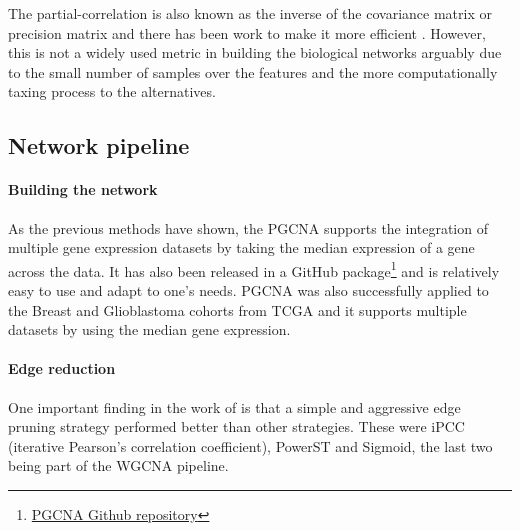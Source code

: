 The partial-correlation is also known as the inverse of the covariance matrix or precision matrix and there has been work to make it more efficient \citep{Ghanbari2019-tq}. However, this is not a widely used metric in building the biological networks arguably due to the small number of samples over the features and the more computationally taxing process to the alternatives.

\subsection{Network pipeline}

\vspace{3mm}
\vspace{3mm}

\paragraph*{Building the network} 

As the previous methods have shown, the PGCNA supports the integration of multiple gene expression datasets by taking the median expression of a gene across the data. It has also been released in a GitHub package\footnote{\href{https://github.com/medmaca/PGCNA}{PGCNA Github repository}} and is relatively easy to use and adapt to one's needs. PGCNA was also successfully applied to the Breast and Glioblastoma cohorts from TCGA and it supports multiple datasets by using the median gene expression.

\paragraph*{Edge reduction}

One important finding in the work of \citet{Care2019-ij} is that a simple and aggressive edge pruning strategy performed better than other strategies. These were iPCC (iterative Pearson’s correlation coefficient), PowerST and Sigmoid, the last two being part of the WGCNA pipeline.

